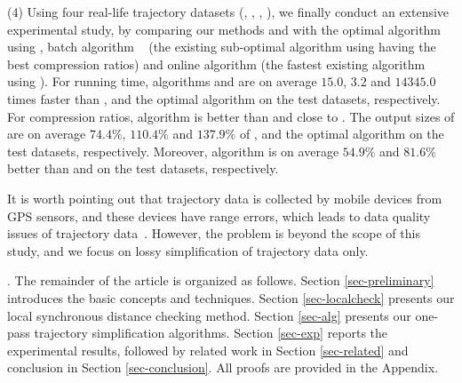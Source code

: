 \sstab (4) Using four real-life trajectory datasets (\sercar, \geolife, \mopsi, \pricar),
we finally conduct an extensive experimental study, by comparing our methods \cist and \cista  with the optimal \lsa algorithm using \sed, batch algorithm \dps~\cite{Meratnia:Spatiotemporal} (the existing sub-optimal \lsa algorithm using \sed having the best compression ratios) and online algorithm \squishe \cite{Muckell:Compression} (the fastest existing \lsa algorithm using \sed).
%
For running time, algorithms \cist and \cista are on average $15.0$, $3.2$ and $14345.0$ times faster than \dps, \squishe and the optimal \lsa algorithm on the test datasets, respectively.
%
For compression ratios, algorithm \cist is better than \squishe and close to \dps. The output sizes of \cist are on average $74.4\%$, $110.4\%$ and $137.9\%$ of \squishe, \dps and the optimal \lsa algorithm on the test datasets, respectively.
Moreover, algorithm \cista is on average $54.9\%$ and $81.6\%$ better than \squishe and \dps on the test datasets, respectively.

It is worth pointing out that trajectory data is collected by mobile devices from GPS sensors, and these devices have range errors, which leads to data quality issues of  trajectory data~\cite{PfoserJ99,ZufleTPRRLDE17}. However, the problem is beyond the scope of this study, and we focus on lossy simplification of trajectory data only.
%

.
The remainder of the article is organized as follows.
Section \ref{sec-preliminary} introduces the basic concepts and techniques.
Section \ref{sec-localcheck} presents our local synchronous distance checking method.
Section \ref{sec-alg} presents our one-pass trajectory simplification algorithms.
Section \ref{sec-exp} reports the experimental results, followed by related work in
Section \ref{sec-related} and conclusion in Section \ref{sec-conclusion}.
All proofs are provided in the Appendix.





